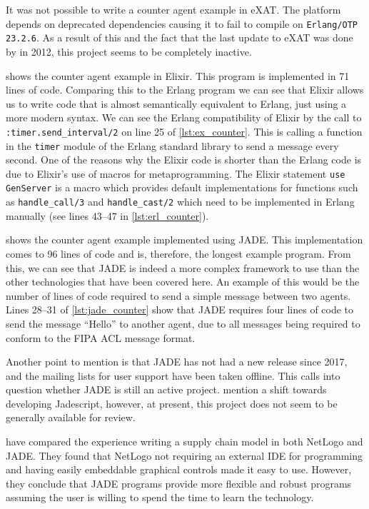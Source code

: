 It was not possible to write a counter agent example in eXAT\@.
The platform depends on deprecated dependencies causing it to fail to compile on \verb|Erlang/OTP 23.2.6|.
As a result of this and the fact that the last update to eXAT was done by  in 2012, this project seems to be completely inactive.

 shows the counter agent example in Elixir.
This program is implemented in 71 lines of code.
Comparing this to the Erlang program we can see that Elixir allows us to write code that is almost semantically equivalent to Erlang, just using a more modern syntax.
We can see the Erlang compatibility of Elixir by the call to \verb|:timer.send_interval/2| on line 25 of \cref{lst:ex_counter}.
This is calling a function in the \verb|timer| module of the Erlang standard library to send a message every second.
One of the reasons why the Elixir code is shorter than the Erlang code is due to Elixir's use of macros for metaprogramming.
The Elixir statement \verb|use GenServer| is a macro which provides default implementations for functions such as \verb|handle_call/3| and \verb|handle_cast/2| which need to be implemented in Erlang manually (see lines 43--47 in \cref{lst:erl_counter}).

 shows the counter agent example implemented using JADE\@.
This implementation comes to 96 lines of code and is, therefore, the longest example program.
From this, we can see that JADE is indeed a more complex framework to use than the other technologies that have been covered here.
An example of this would be the number of lines of code required to send a simple message between two agents.
Lines 28--31 of \cref{lst:jade_counter} show that JADE requires four lines of code to send the message ``Hello'' to another agent, due to all messages being required to conform to the FIPA ACL message format.

Another point to mention is that JADE has not had a new release since 2017, and the mailing lists for user support have been taken offline.
This calls into question whether JADE is still an active project.
 mention a shift towards developing Jadescript, however, at present, this project does not seem to be generally available for review.

 have compared the experience writing a supply chain model in both NetLogo and JADE\@.
They found that NetLogo not requiring an external IDE for programming and having easily embeddable graphical controls made it easy to use.
However, they conclude that JADE programs provide more flexible and robust programs assuming the user is willing to spend the time to learn the technology.

